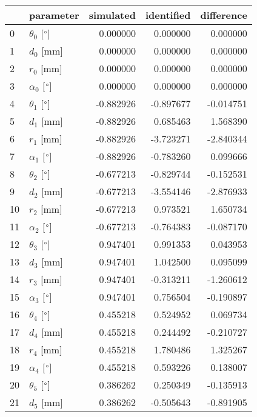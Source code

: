 \documentclass{standalone}%
\begin{document}
%
\normalsize%
\begin{tabular}{llrrr}
\toprule
{} &                 parameter & simulated & identified & difference \\
\midrule
0  &  $\theta_{0}$ [$\degree$] &  0.000000 &   0.000000 &   0.000000 \\
1  &              $d_{0}$ [mm] &  0.000000 &   0.000000 &   0.000000 \\
2  &              $r_{0}$ [mm] &  0.000000 &   0.000000 &   0.000000 \\
3  &  $\alpha_{0}$ [$\degree$] &  0.000000 &   0.000000 &   0.000000 \\
4  &  $\theta_{1}$ [$\degree$] & -0.882926 &  -0.897677 &  -0.014751 \\
5  &              $d_{1}$ [mm] & -0.882926 &   0.685463 &   1.568390 \\
6  &              $r_{1}$ [mm] & -0.882926 &  -3.723271 &  -2.840344 \\
7  &  $\alpha_{1}$ [$\degree$] & -0.882926 &  -0.783260 &   0.099666 \\
8  &  $\theta_{2}$ [$\degree$] & -0.677213 &  -0.829744 &  -0.152531 \\
9  &              $d_{2}$ [mm] & -0.677213 &  -3.554146 &  -2.876933 \\
10 &              $r_{2}$ [mm] & -0.677213 &   0.973521 &   1.650734 \\
11 &  $\alpha_{2}$ [$\degree$] & -0.677213 &  -0.764383 &  -0.087170 \\
12 &  $\theta_{3}$ [$\degree$] &  0.947401 &   0.991353 &   0.043953 \\
13 &              $d_{3}$ [mm] &  0.947401 &   1.042500 &   0.095099 \\
14 &              $r_{3}$ [mm] &  0.947401 &  -0.313211 &  -1.260612 \\
15 &  $\alpha_{3}$ [$\degree$] &  0.947401 &   0.756504 &  -0.190897 \\
16 &  $\theta_{4}$ [$\degree$] &  0.455218 &   0.524952 &   0.069734 \\
17 &              $d_{4}$ [mm] &  0.455218 &   0.244492 &  -0.210727 \\
18 &              $r_{4}$ [mm] &  0.455218 &   1.780486 &   1.325267 \\
19 &  $\alpha_{4}$ [$\degree$] &  0.455218 &   0.593226 &   0.138007 \\
20 &  $\theta_{5}$ [$\degree$] &  0.386262 &   0.250349 &  -0.135913 \\
21 &              $d_{5}$ [mm] &  0.386262 &  -0.505643 &  -0.891905 \\

\end{tabular}
\end{document}
